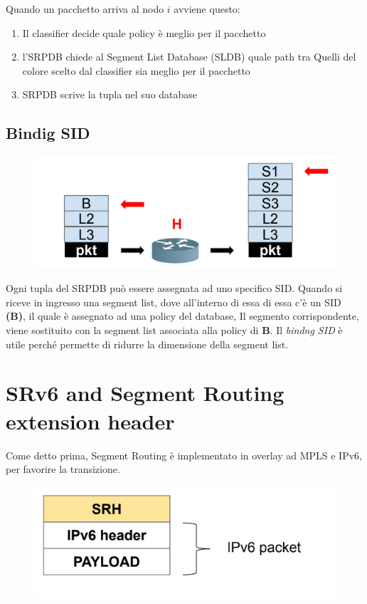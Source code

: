\documentclass[12pt]{article}
\begin{document}
Quando un pacchetto arriva al nodo \(i\) avviene questo: 
\begin{enumerate}
    \item Il classifier decide quale policy è meglio per il pacchetto
    \item l'SRPDB chiede al Segment List Database (SLDB) quale path tra Quelli
    del colore scelto dal classifier sia meglio per il pacchetto
    \item SRPDB scrive la tupla nel suo database
\end{enumerate}  

\subsection{Bindig SID}

\begin{figure}[h]
    \includegraphics*[scale = 0.5]{F9.png}
    \centering
\end{figure}

Ogni tupla del SRPDB può essere assegnata ad uno specifico SID. Quando si riceve in ingresso
una segment list, dove all'interno di essa di essa c'è un SID \textbf{(B)}, il quale è assegnato ad una policy del database, 
Il segmento corrispondente, viene sostituito con la segment list associata alla policy di \textbf{B}. 
Il \textit{bindng SID} è utile perché permette di ridurre la dimensione della segment list. 

\section{SRv6 and Segment Routing extension header}

Come detto prima, Segment Routing è implementato in overlay ad MPLS e IPv6, per favorire
la transizione. 

\begin{figure}[h]
    \includegraphics*[scale = 0.5]{F10.png}
    \centering
\end{figure}
\end{document}
